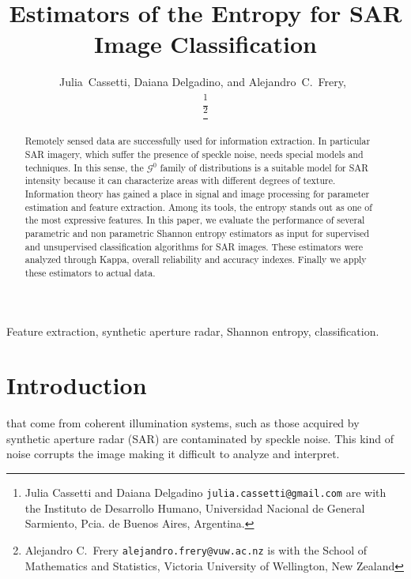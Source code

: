 \documentclass[journal]{IEEEtran}
\begin{document}
\title{Estimators of the Entropy for SAR Image Classification}
\author{ Julia~Cassetti, Daiana Delgadino, and Alejandro~C.~Frery,~


\thanks{Julia Cassetti and Daiana Delgadino \texttt{julia.cassetti@gmail.com} are with the  Instituto de Desarrollo Humano, Universidad Nacional de General Sarmiento, Pcia. de Buenos Aires, Argentina.}

\thanks{Alejandro C.\ Frery \texttt{alejandro.frery@vuw.ac.nz} is with the School of Mathematics and Statistics, Victoria University of Wellington, New Zealand} 
}

\maketitle

\begin{abstract}
	
Remotely sensed data are successfully used for information extraction. 
In particular SAR imagery, which suffer the presence of speckle noise, needs special models and techniques. 
In this sense, the $\mathcal G^0$ family of distributions is a suitable model for SAR intensity because it can characterize areas with different degrees of texture. 
Information theory has gained a place in signal and image processing for parameter estimation and feature extraction.
Among its tools, the entropy stands out as one of the most expressive features.
In this paper, we evaluate the performance of several parametric and non parametric Shannon entropy estimators as input for supervised and unsupervised classification algorithms for SAR images.
These estimators were analyzed through Kappa, overall reliability and accuracy indexes. 
Finally we apply these estimators to actual data.

\end{abstract}

\begin{keywords}
Feature extraction, synthetic aperture radar, Shannon entropy, classification.
\end{keywords}

\IEEEpeerreviewmaketitle

\section{Introduction}
\label{intro}
 that come from coherent illumination systems, such as those acquired by synthetic aperture radar (SAR) are contaminated by speckle noise. 
This kind of noise corrupts the image making it difficult to analyze and interpret. 
\end{document}

